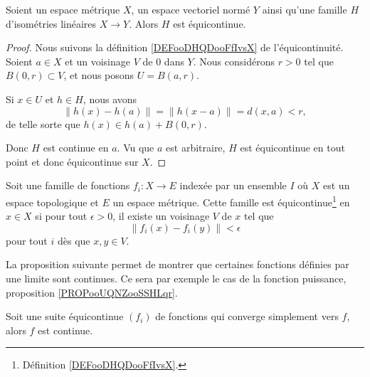 \begin{lemma}        \label{LEMooMIHJooUhvPgM}
    Soient un espace métrique \( X\), un espace vectoriel normé \( Y\) ainsi qu'une famille \( H\) d'isométries linéaires \( X\to Y\). Alors \( H\) est équicontinue.
\end{lemma}

\begin{proof}
    Nous suivons la définition \ref{DEFooDHQDooFfIvsX} de l'équicontinuité. Soient \( a\in X\) et un voisinage \( V\) de \( 0\) dans \( Y\). Nous considérons \( r>0\) tel que \( B(0,r)\subset V\), et nous posons \( U=B(a,r)\).

    Si \( x\in U\) et \( h\in H\), nous avons
    \begin{equation}
        \| h(x)-h(a) \|=\| h(x-a) \|=d(x,a)<r,
    \end{equation}
    de telle sorte que \( h(x)\in h(a)+B(0,r)\).

    Donc \( H\) est continue en \( a\). Vu que \( a\) est arbitraire, \( H\) est équicontinue en tout point et donc équicontinue sur \( X\).
\end{proof}

\begin{lemma}           \label{LEMooKEMRooYyqsBl}
    Soit une famille de fonctions \( f_i\colon X\to E\) indexée par un ensemble \( I\) où \( X\) est un espace topologique et \( E\) un espace métrique. Cette famille est équicontinue\footnote{Définition \ref{DEFooDHQDooFfIvsX}.} en \( x\in X\) si pour tout \( \epsilon>0\), il existe un voisinage \( V\) de \( x\) tel que
	\begin{equation}
		\| f_i(x)-f_i(y) \|<\epsilon
	\end{equation}
	pour tout \( i\) dès que \( x,y\in V\).
\end{lemma}

La proposition suivante permet de montrer que certaines fonctions définies par une limite sont continues. Ce sera par exemple le cas de la fonction puissance, proposition \ref{PROPooUQNZooSSHLqr}.
\begin{proposition}     \label{PROPooICNNooAMjcut}
	Soit une suite équicontinue \( (f_i)\) de fonctions qui converge simplement vers \( f\), alors \( f\) est continue.
\end{proposition}

